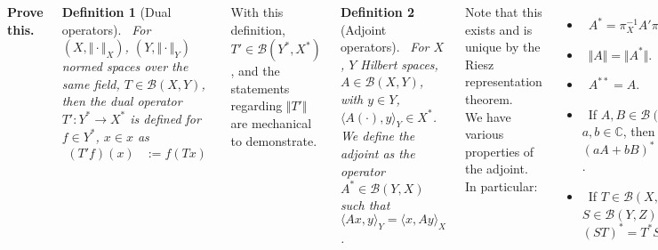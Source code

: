 \documentclass{tikzposter} %
\newtheorem{definition}{Definition}
\begin{document}
\begin{columns}
{    \textbf{Prove this.} \\

      \begin{definition}[Dual operators]
        \ For $(X, \Vert \cdot \Vert_{X})$, $(Y, \Vert \cdot \Vert_{Y})$ normed spaces over the same field, $T \in \mathcal{B}(X,Y)$, then the dual operator $T' : Y^{*} \to X^{*}$ is defined for $f \in Y^{*}$, $x \in x$ as
        \begin{align*}
          (T'f)(x) &:= f(Tx)
        \end{align*}
      \end{definition}
      \hphantom{}

      With this definition, $T' \in \mathcal{B}(Y^{*},X^{*})$, and the statements regarding $\Vert T' \Vert$ are mechanical to demonstrate. \\

      \begin{definition}[Adjoint operators]
      \ For $X$, $Y$ Hilbert spaces, $A \in \mathcal{B}(X,Y)$, with $y \in Y$, $\langle A(\cdot), y \rangle_{Y} \in X^{*}$. We define the adjoint as the operator $A^{*} \in \mathcal{B}(Y,X)$ such that $\langle Ax, y \rangle_{Y} = \langle x, Ay \rangle_{X}$.
      \end{definition}
      \hphantom{}

      Note that this exists and is unique by the Riesz representation theorem. \\

      We have various properties of the adjoint. In particular:
      \begin{itemize}
              \item \ $A^{*} = \pi_{X}^{-1}A'\pi_{Y}$.
              \item \ $\Vert A \Vert = \Vert A^{*} \Vert$.
              \item \ $A^{**} = A$.
              \item \ If $A,B \in \mathcal{B}(X,Y)$, $a, b \in \mathbb{C}$, then $(aA+bB)^{*}=\overline{a}A^{*}+\overline{b}B^{*}$.
              \item \ If $T \in \mathcal{B}(X,Y)$, $S \in \mathcal{B}(Y,Z)$, then $(ST)^{*} = T^{*}S^{*}$.
      \end{itemize}
      \hphantom{}
      Additionally, if $X = Y$, then the identity is invariant under adjoint, and an operator is invertible iff its adjoint is. \\

      Finally, we have that $\ker A = (\mathrm{im} A^{*})^{\perp}$, and $(\ker A)^{\perp} = \overline{\mathrm{im} A^{*}}$. \\

}
\end{columns}
\end{document}
